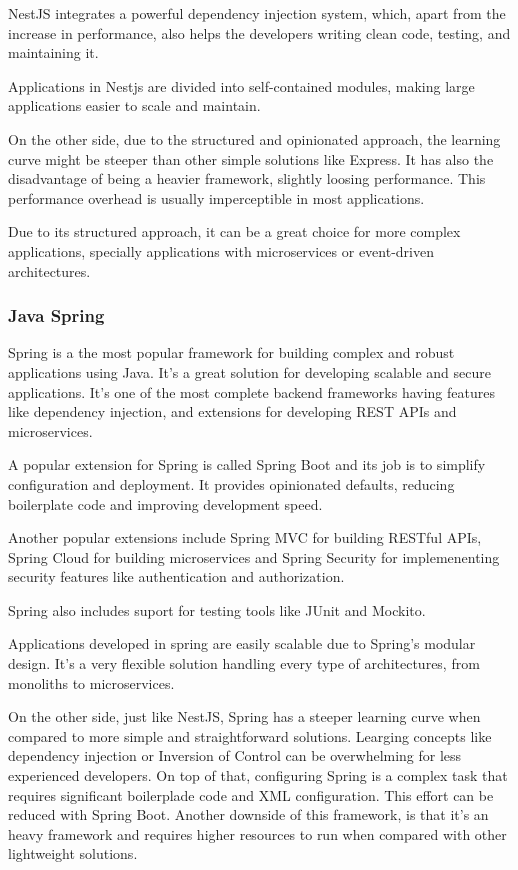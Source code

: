 NestJS integrates a powerful dependency injection system, which, apart from the
increase in performance, also helps the developers writing clean code, testing,
and maintaining it.

Applications in Nestjs are divided into
self-contained modules, making large applications easier to scale and maintain.

On the other side, due to the structured and opinionated approach, the learning
curve might be steeper than other simple solutions like Express.
It has also the disadvantage of being a heavier framework, slightly loosing
performance. This performance overhead is usually imperceptible in most
applications.

Due to its structured approach, it can be a great choice for more complex
applications, specially applications with microservices or event-driven
architectures.
\subsubsection{Java Spring}
Spring is a the most popular framework for building complex and robust
applications using Java. It's a great solution for developing scalable and secure
applications. It's one of the most complete backend frameworks having features
like dependency injection, and extensions for developing REST APIs and
microservices.

A popular extension for Spring is called Spring Boot and its job is to
simplify configuration and deployment. It provides opinionated defaults,
reducing boilerplate code and improving development speed.

Another popular extensions include Spring MVC for building RESTful APIs, Spring
Cloud for building microservices and Spring Security for implemenenting
security features like authentication and authorization.

Spring also includes suport for testing tools like JUnit and Mockito.

Applications developed in spring are easily scalable due to Spring's modular
design.
It's a very flexible solution handling every type of architectures, from
monoliths to microservices.

On the other side, just like NestJS, Spring has a steeper learning curve when
compared to more simple and straightforward solutions. Learging concepts like
dependency injection or Inversion of Control can be overwhelming for less
experienced developers.
On top of that, configuring Spring is a complex task that requires significant
boilerplade code and XML configuration. This effort can be reduced with Spring
Boot.
Another downside of this framework, is that it's an heavy framework and
requires higher resources to run when compared with other lightweight solutions.

